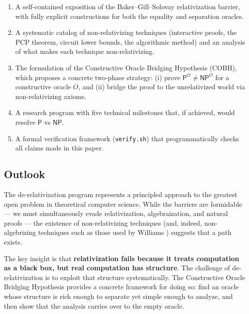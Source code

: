 \documentclass[11pt,a4paper]{article}
\theoremstyle{plain}
\theoremstyle{definition}
\theoremstyle{remark}
\newcommand{\PP}{\mathsf{P}}
\newcommand{\NP}{\mathsf{NP}}
\begin{document}
\begin{enumerate}
    \item A self-contained exposition of the Baker--Gill--Solovay relativization
    barrier, with fully explicit constructions for both the equality and
    separation oracles.

    \item A systematic catalog of non-relativizing techniques (interactive
    proofs, the PCP theorem, circuit lower bounds, the algorithmic method) and
    an analysis of what makes each technique non-relativizing.

    \item The formulation of the Constructive Oracle Bridging Hypothesis
    (COBH), which proposes a concrete two-phase strategy: (i) prove
    $\PP^O \neq \NP^O$ for a constructive oracle $O$, and (ii) bridge the proof
    to the unrelativized world via non-relativizing axioms.

    \item A research program with five technical milestones that, if achieved,
    would resolve $\PP$ vs $\NP$.

    \item A formal verification framework (\texttt{verify.sh}) that
    programmatically checks all claims made in this paper.
\end{enumerate}

\subsection{Outlook}

The de-relativization program represents a principled approach to the greatest
open problem in theoretical computer science.  While the barriers are formidable
— we must simultaneously evade relativization, algebraization, and natural
proofs — the existence of non-relativizing techniques (and, indeed,
non-algebrizing techniques such as those used by Williams \cite{Williams14})
suggests that a path exists.

The key insight is that \textbf{relativization fails because it treats
computation as a black box, but real computation has structure}.  The challenge
of de-relativization is to exploit that structure systematically.  The
Constructive Oracle Bridging Hypothesis provides a concrete framework for doing
so: find an oracle whose structure is rich enough to separate yet simple enough
to analyze, and then show that the analysis carries over to the empty oracle.
\end{document}

